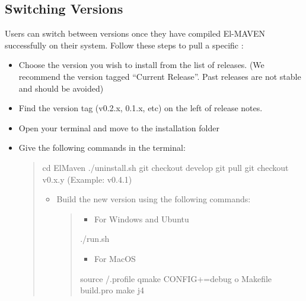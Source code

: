 \documentclass[letterpaper,10pt,english,openany,oneside]{sphinxmanual}
\begin{document}
\subsection{Switching Versions}
\label{\detokenize{Build:switching-versions}}
Users can switch between versions once they have compiled El-MAVEN successfully on their system.
Follow these steps to pull a specific :
\begin{itemize}
\item {} 
Choose the version you wish to install from the list of releases. (We recommend the version tagged “Current Release”. Past releases are not stable and should be avoided)

\item {} 
Find the version tag (v0.2.x, 0.1.x, etc) on the left of release notes.

\item {} 
Open your terminal and move to the installation folder

\item {} 
Give the following commands in the terminal:
\begin{quote}

%
\begin{sphinxVerbatim}[commandchars=\\\{\}]
\PYGZdl{} cd ElMaven
\PYGZdl{} ./uninstall.sh
\PYGZdl{} git checkout develop
\PYGZdl{} git pull
\PYGZdl{} git checkout v0.x.y (Example: v0.4.1)
\end{sphinxVerbatim}
\begin{itemize}
\item {} 
Build the new version using the following commands:
\begin{quote}
\begin{itemize}
\item {} 
For Windows and Ubuntu

\end{itemize}

%
\begin{sphinxVerbatim}[commandchars=\\\{\}]
\PYGZdl{} ./run.sh
\end{sphinxVerbatim}
\begin{itemize}
\item {} 
For MacOS

\end{itemize}

%
\begin{sphinxVerbatim}[commandchars=\\\{\}]
\PYGZdl{} source \PYGZti{}/.profile
\PYGZdl{} qmake CONFIG+=debug \PYGZhy{}o Makefile build.pro
\PYGZdl{} make \PYGZhy{}j4
\end{sphinxVerbatim}
\end{quote}

\end{itemize}
\end{quote}

\end{itemize}
\end{document}
